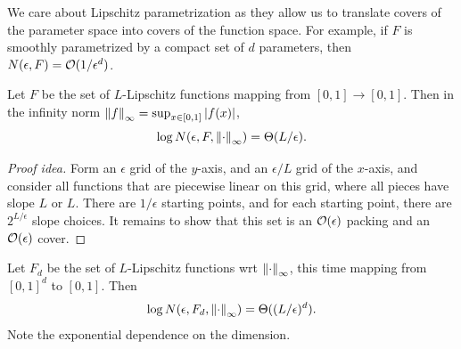 \documentclass[11pt]{article}
\begin{document}
  We care about Lipschitz parametrization as they allow us to translate covers of the parameter space
  into covers of the function space.
  For example, if $F$ is smoothly parametrized by a compact set of $d$ parameters,
  then $N(\epsilon, F) = \mathcal{O}(1/\epsilon^d)$.
  \begin{example}
    Let $F$ be the set of $L$-Lipschitz functions mapping from $[0,1] \to [0,1]$. Then
    in the infinity norm $\left\lVert f\right\rVert_\infty = \sup_{x\in [0,1]} \left\lvert f(x)\right\rvert$, 
    $$
    \log{N(\epsilon,F,\left\lVert\cdot\right\rVert_\infty)} = \Theta(L/\epsilon).
    $$
  \end{example}
  \begin{proof}[Proof idea]
   Form an $\epsilon$ grid of the $y$-axis, and an $\epsilon/L$ grid of the $x$-axis, and
   consider all functions that are piecewise linear on this grid, where all pieces have slope
   $L$ or $L$. There are $1/\epsilon$ starting points, and for each starting point,
   there are $2^{L/\epsilon}$ slope choices. It remains to show that this set is an $\mathcal{O}(\epsilon)$
   packing and an $\mathcal{O}(\epsilon)$ cover.
  \end{proof}
  \begin{example}
    Let $F_d$ be the set of $L$-Lipschitz functions wrt $\left\lVert\cdot\right\rVert_\infty$, this time mapping from $[0,1]^d$
    to $[0,1]$. Then
    $$
    \log{N}(\epsilon, F_d,\left\lVert\cdot\right\rVert_\infty) = \Theta((L/\epsilon)^d).
    $$
    Note the exponential dependence on the dimension.
  \end{example}
\end{document}
